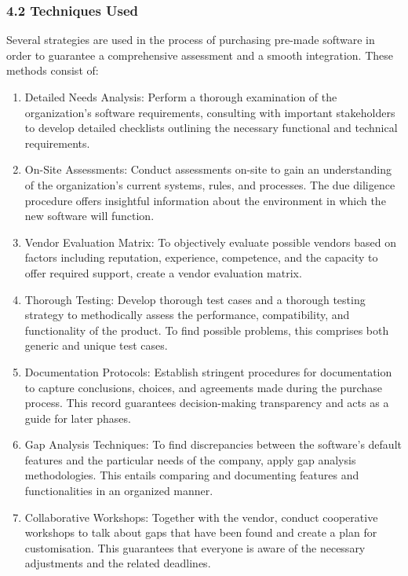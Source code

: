 \documentclass[letterpaper, 11pt]{report}
\begin{document}
\subsubsection*{4.2 Techniques Used}
\normalsize{Several strategies are used in the process of purchasing pre-made software in order to guarantee a comprehensive assessment and a smooth integration. These methods consist of:
\begin{enumerate}
    \item Detailed Needs Analysis: Perform a thorough examination of the organization's software requirements, consulting with important stakeholders to develop detailed checklists outlining the necessary functional and technical requirements.
    
    \item On-Site Assessments: Conduct assessments on-site to gain an understanding of the organization's current systems, rules, and processes. The due diligence procedure offers insightful information about the environment in which the new software will function.
    
    \item Vendor Evaluation Matrix: To objectively evaluate possible vendors based on factors including reputation, experience, competence, and the capacity to offer required support, create a vendor evaluation matrix.

    \item Thorough Testing: Develop thorough test cases and a thorough testing strategy to methodically assess the performance, compatibility, and functionality of the product. To find possible problems, this comprises both generic and unique test cases.

    \item Documentation Protocols: Establish stringent procedures for documentation to capture conclusions, choices, and agreements made during the purchase process. This record guarantees decision-making transparency and acts as a guide for later phases.

    \item Gap Analysis Techniques: To find discrepancies between the software's default features and the particular needs of the company, apply gap analysis methodologies. This entails comparing and documenting features and functionalities in an organized manner.

    \item Collaborative Workshops: Together with the vendor, conduct cooperative workshops to talk about gaps that have been found and create a plan for customisation. This guarantees that everyone is aware of the necessary adjustments and the related deadlines.


\end{enumerate}}
\end{document}
